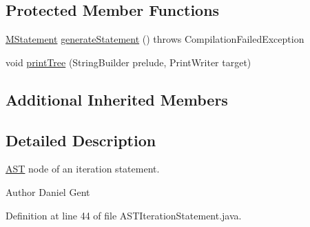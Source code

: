 \subsection*{Protected Member Functions}
\begin{DoxyCompactItemize}
\item 
\hyperlink{classorg_1_1tzi_1_1use_1_1uml_1_1sys_1_1soil_1_1_m_statement}{M\-Statement} \hyperlink{classorg_1_1tzi_1_1use_1_1parser_1_1soil_1_1ast_1_1_a_s_t_iteration_statement_ad9c4691abaf46f4ba24517ae28d244d8}{generate\-Statement} ()  throws Compilation\-Failed\-Exception 
\item 
void \hyperlink{classorg_1_1tzi_1_1use_1_1parser_1_1soil_1_1ast_1_1_a_s_t_iteration_statement_a61f1353d68ab34924d2dd3549b05b479}{print\-Tree} (String\-Builder prelude, Print\-Writer target)
\end{DoxyCompactItemize}
\subsection*{Additional Inherited Members}


\subsection{Detailed Description}
\hyperlink{classorg_1_1tzi_1_1use_1_1parser_1_1_a_s_t}{A\-S\-T} node of an iteration statement. \begin{DoxyAuthor}{Author}
Daniel Gent 
\end{DoxyAuthor}


Definition at line 44 of file A\-S\-T\-Iteration\-Statement.\-java.



